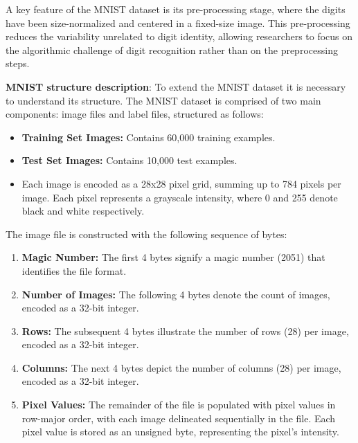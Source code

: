 A key feature of the MNIST dataset is its pre-processing stage, where the digits have been size-normalized and centered in a fixed-size image. This pre-processing reduces the variability unrelated to digit identity, allowing researchers to focus on the algorithmic challenge of digit recognition rather than on the preprocessing steps.




\textbf{MNIST structure description}: To extend the MNIST dataset it is necessary to understand its structure. The MNIST dataset is comprised of two main components: image files and label files, structured as follows:

\begin{itemize}
    \item \textbf{Training Set Images:} Contains 60,000 training examples.
    \item \textbf{Test Set Images:} Contains 10,000 test examples.
    \item Each image is encoded as a 28x28 pixel grid, summing up to 784 pixels per image. Each pixel represents a grayscale intensity, where 0 and 255 denote black and white respectively.
\end{itemize}

The image file is constructed with the following sequence of bytes:
\begin{enumerate}
    \item \textbf{Magic Number:} The first 4 bytes signify a magic number (2051) that identifies the file format.
    \item \textbf{Number of Images:} The following 4 bytes denote the count of images, encoded as a 32-bit integer.
    \item \textbf{Rows:} The subsequent 4 bytes illustrate the number of rows (28) per image, encoded as a 32-bit integer.
    \item \textbf{Columns:} The next 4 bytes depict the number of columns (28) per image, encoded as a 32-bit integer.
    \item \textbf{Pixel Values:} The remainder of the file is populated with pixel values in row-major order, with each image delineated sequentially in the file. Each pixel value is stored as an unsigned byte, representing the pixel's intensity.
\end{enumerate}

